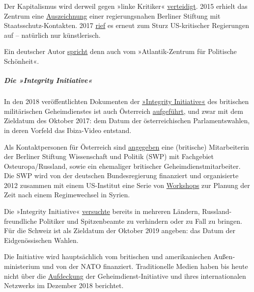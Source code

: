 Der Kapitalismus wird derweil gegen »linke Kritiker«
\href{https://www.welt.de/kultur/article152433895/Die-Politik-ist-auf-Abschottung-konzentriert.html}{verteidigt}.
2015 erhielt das Zentrum eine
\href{https://www.youtube.com/watch?v=6Ro4_Wv4BFE}{Auszeichnung} einer
regierungs­nahen Berliner Stiftung mit Staatsschutz-Kontakten. 2017
\href{https://www.ksta.de/kultur/zentrum-fuer-politische-schoenheit-flugblaetter-gegen-diktatoren-27863928}{rief}
es erneut zum Sturz US-kritischer Regierungen auf -- natürlich nur
künstlerisch.

Ein deutscher Autor
\href{http://www.barth-engelbart.de/?p=68977}{spricht} denn auch vom
»Atlantik-Zentrum für Politische Schönheit«.

\hypertarget{die-integrity-initiative}{%
\subparagraph{\texorpdfstring{\textbf{Die »Integrity
Initiative«}}{Die »Integrity Initiative«}}\label{die-integrity-initiative}}

In den 2018 veröffentlichten Dokumenten der
\href{https://swprs.org/die-integrity-initiative/}{»Integrity
Initiative«} des britischen militärischen Geheimdienstes ist auch
Österreich
\href{https://www.pdf-archive.com/2018/11/02/xcountry/xcountry.pdf}{aufgeführt},
und zwar mit dem Zieldatum des Oktober 2017: dem Datum der
österreichischen Parlamentswahlen, in deren Vorfeld das Ibiza-Video
entstand.

Als Kontaktpersonen für Österreich sind
\href{https://www.pdf-archive.com/2018/11/02/xcountry/xcountry.pdf}{angegeben}
eine (britische) Mitarbeiterin der Berliner Stiftung Wissenschaft und
Politik (SWP) mit Fachgebiet Osteuropa/Russland, sowie ein ehemaliger
britischer Geheimdienstmitarbeiter. Die SWP wird von der deutschen
Bundes­regierung finanziert und organisierte 2012 zusammen mit einem
US-Institut eine Serie von
\href{http://www.zeit.de/2012/31/Syrien-Bundesregierung}{Workshops} zur
Planung der Zeit nach einem Regimewechsel in Syrien.

Die »Integrity Initiative«
\href{https://swprs.org/die-integrity-initiative/}{versuchte} bereits in
mehreren Ländern, Russland-freundliche Politiker und Spitzenbeamte zu
verhindern oder zu Fall zu bringen. Für die Schweiz ist als Zieldatum
der Oktober 2019 angeben: das Datum der Eidgenössischen Wahlen.

Die Initiative wird hauptsächlich vom britischen und amerikanischen
Außen­ministerium und von der NATO finanziert. Traditionelle Medien
haben bis heute nicht über die
\href{https://swprs.org/die-integrity-initiative/}{Aufdeckung} der
Geheimdienst-Initiative und ihres internationalen Netzwerks im Dezember
2018 berichtet.

